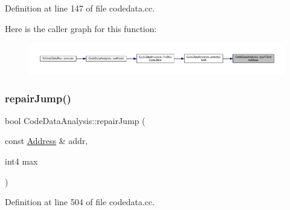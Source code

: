 Definition at line 147 of file codedata.\+cc.

Here is the caller graph for this function\+:
\nopagebreak
\begin{figure}[H]
\begin{center}
\leavevmode
\includegraphics[width=350pt]{class_code_data_analysis_aa8cc98d84537294fa40b2f6dd9dce67c_icgraph}
\end{center}
\end{figure}
\mbox{\label{class_code_data_analysis_a0c1f590455ec5bdd79d45bfe73b0a640}} 
\subsubsection{\texorpdfstring{repairJump()}{repairJump()}}
{\footnotesize\ttfamily bool Code\+Data\+Analysis\+::repair\+Jump (\begin{DoxyParamCaption}\item[{const \mbox{\hyperlink{class_address}{Address}} \&}]{addr,  }\item[{int4}]{max }\end{DoxyParamCaption})}



Definition at line 504 of file codedata.\+cc.

